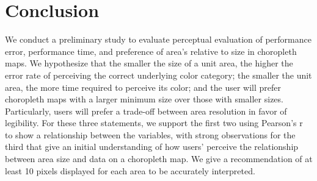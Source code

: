 \section{Conclusion} \label{sec:conclusion}
We conduct a preliminary study to evaluate perceptual evaluation of performance error, performance time, and preference of area's relative to size in choropleth maps. We hypothesize that the smaller the size of a unit area, the higher the error rate of perceiving the correct underlying color category; the smaller the unit area, the more time required to perceive its color; and the user will prefer choropleth maps with a larger minimum size over those with smaller sizes. Particularly, users will prefer a trade-off between area resolution in favor of legibility. For these three statements, we support the first two using Pearson's r to show a relationship between the variables, with strong observations for the third that give an initial understanding of how users' perceive the relationship between area size and data on a choropleth map. We give a recommendation of at least 10 pixels displayed for each area to be accurately interpreted.


